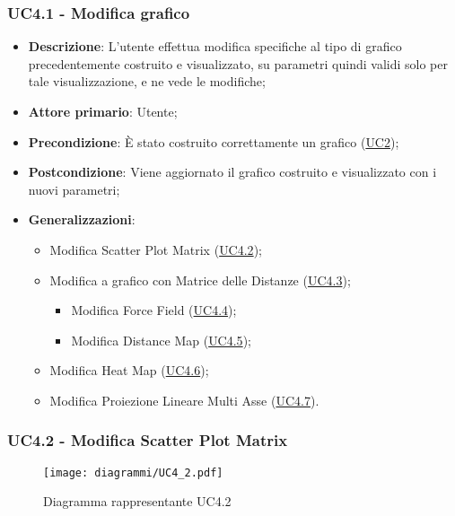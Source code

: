 \newpage
\subsubsection{UC4.1 - Modifica grafico}
\label{ssub:uc4.1}

\begin{itemize}
    \item \textbf{Descrizione}: L’utente effettua modifica specifiche al tipo di grafico precedentemente costruito e visualizzato,
                                su parametri quindi validi solo per tale visualizzazione, e ne vede le modifiche;

    \item \textbf{Attore primario}: Utente;

    \item \textbf{Precondizione}:   È stato costruito correttamente un grafico (\hyperref[sub:uc2]{UC2});

    \item \textbf{Postcondizione}:  Viene aggiornato il grafico costruito e visualizzato con i nuovi parametri;

    \item \textbf{Generalizzazioni}:
        \begin{itemize}
            \item Modifica Scatter Plot Matrix (\hyperref[ssub:uc4.2]{UC4.2});
            \item Modifica a grafico con Matrice delle Distanze (\hyperref[ssub:uc4.3]{UC4.3});
            \begin{itemize}
                \item Modifica Force Field (\hyperref[ssub:uc4.4]{UC4.4});
                \item Modifica Distance Map (\hyperref[ssub:uc4.5]{UC4.5});
             \end{itemize}
            \item Modifica Heat Map (\hyperref[ssub:uc4.6]{UC4.6});
            \item Modifica Proiezione Lineare Multi Asse (\hyperref[ssub:uc4.7]{UC4.7}).
        \end{itemize}
\end{itemize}

\subsubsection{UC4.2 - Modifica Scatter Plot Matrix}
\label{ssub:uc4.2}

\begin{figure}[h]
    \centering
    \texttt{[image: diagrammi/UC4\_2.pdf]}
    \caption{Diagramma rappresentante UC4.2}
    \label{fig:UC4.2}
\end{figure}


